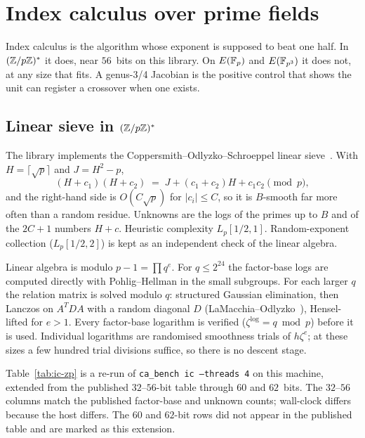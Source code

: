 \section{Index calculus over prime fields}
\label{sec:indexcalc}

Index calculus is the algorithm whose exponent is supposed to beat
one half. In $(\mathbb{Z}/p\mathbb{Z})^*$ it does, near $56$~bits on this library.
On $E(\mathbb{F}_p)$ and $E(\mathbb{F}_{p^3})$ it does not, at any size that fits.
A genus-3/4 Jacobian is the positive control that shows the unit can
register a crossover when one exists.

\subsection{\texorpdfstring{Linear sieve in $(\mathbb{Z}/p\mathbb{Z})^*$}{Linear sieve in (Z/pZ)*}}
\label{sec:ic-mult}

The library implements the Coppersmith--Odlyzko--Schroeppel linear
sieve~\cite{cos1986}. With $H=\lceil\sqrt{p}\rceil$ and $J=H^2-p$,
\[
  (H+c_1)(H+c_2) \;=\; J+(c_1+c_2)H+c_1c_2 \pmod{p},
\]
and the right-hand side is $O(C\sqrt{p})$ for $|c_i|\le C$, so it is
$B$-smooth far more often than a random residue. Unknowns are the logs
of the primes up to $B$ and of the $2C+1$ numbers $H+c$. Heuristic
complexity $L_p[1/2,1]$. Random-exponent collection ($L_p[1/2,2]$) is
kept as an independent check of the linear
algebra.

Linear algebra is modulo $p-1=\prod q^e$. For $q\le 2^{24}$ the
factor-base logs are computed directly with Pohlig--Hellman in the
small subgroups. For each larger $q$ the relation matrix is solved
modulo $q$: structured Gaussian elimination, then Lanczos on $A^TDA$
with a random diagonal $D$ (LaMacchia--Odlyzko~\cite{lamacchia1990}),
Hensel-lifted for $e>1$. Every factor-base logarithm is verified
($\zeta^{\log}=q\bmod p$) before it is used. Individual logarithms
are randomised smoothness trials of $h\zeta^e$; at these sizes a few
hundred trial divisions suffice, so there is no descent stage.

Table~\ref{tab:ic-zp} is a re-run of \texttt{ca\_bench ic --threads 4}
on this machine, extended from the published $32$--$56$-bit table
through $60$ and $62$~bits. The $32$--$56$ columns match the published
factor-base and unknown counts; wall-clock differs because the host
differs. The $60$ and $62$-bit rows did not appear in the published
table and are marked as this extension.

